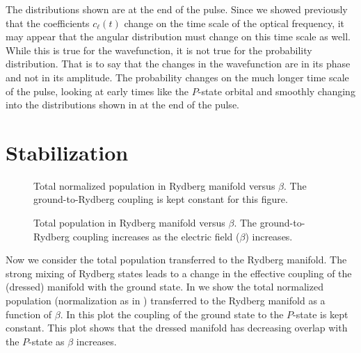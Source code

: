 The distributions shown are at the end of the pulse.  Since we showed
previously that the coefficients $c_{\ell}(t)$ change on the time scale of the
optical frequency, it may appear that the angular distribution must change on
this time scale as well.  While this is true for the wavefunction, it is not
true for the probability distribution.  That is to say that the changes in the
wavefunction are in its phase and not in its amplitude.  The probability
changes on the much longer time scale of the pulse, looking at early times
like the $P$-state orbital and smoothly changing into the distributions shown
in  at the end of the pulse.

\section{Stabilization}
\hspace{\parindent}

\begin{figure}[tbp]
\bigskip
{} {Total normalized
population in Rydberg manifold versus $\beta$.  The ground-to-Rydberg coupling
is kept constant for this figure.
\label{popvbeta}}
\end{figure}

\begin{figure}[tbp]
\bigskip
{} {Total population
in Rydberg manifold versus $\beta$.  The ground-to-Rydberg coupling increases
as the electric field ($\beta$) increases.
\label{popvI}}
\end{figure}

Now we consider the total population transferred to the Rydberg manifold.  The
strong mixing of Rydberg states leads to a change in the effective coupling of
the (dressed) manifold with the ground state.  In  we show the
total normalized population (normalization as in ) transferred to
the Rydberg manifold as a function of
$\beta$.  In this plot the coupling of the ground state to the $P$-state is
kept constant.  This plot shows that the dressed manifold has
decreasing overlap with the $P$-state as $\beta$ increases.

